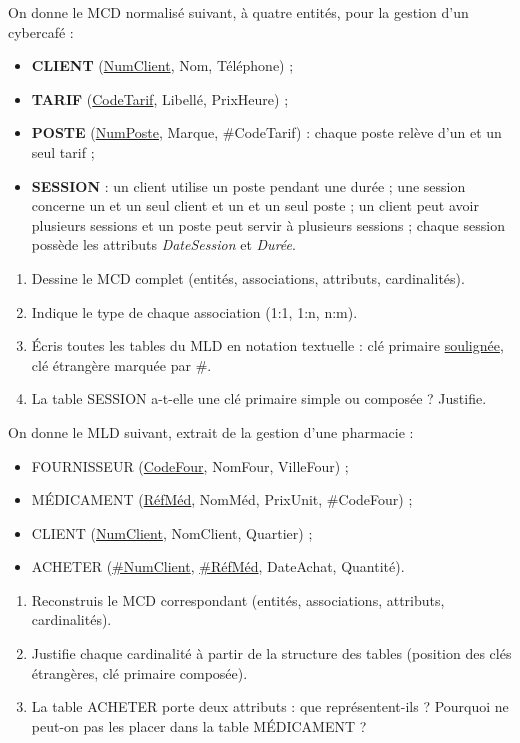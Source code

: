 \documentclass[11pt]{article}
\begin{document}
\begin{exercice}
On donne le MCD normalisé suivant, à quatre entités, pour la gestion d'un cybercafé :

\begin{itemize}
  \item \textbf{CLIENT} (\underline{NumClient}, Nom, Téléphone) ;
  \item \textbf{TARIF} (\underline{CodeTarif}, Libellé, PrixHeure) ;
  \item \textbf{POSTE} (\underline{NumPoste}, Marque, \#CodeTarif) : chaque poste relève d'un et un seul tarif ;
  \item \textbf{SESSION} : un client utilise un poste pendant une durée ; une session concerne un et un seul client et un et un seul poste ; un client peut avoir plusieurs sessions et un poste peut servir à plusieurs sessions ; chaque session possède les attributs \emph{DateSession} et \emph{Durée}.
\end{itemize}

\begin{enumerate}
  \item Dessine le MCD complet (entités, associations, attributs, cardinalités).
  \item Indique le type de chaque association (1:1, 1:n, n:m).
  \item Écris toutes les tables du MLD en notation textuelle : clé primaire \underline{soulignée}, clé étrangère marquée par \#.
  \item La table SESSION a-t-elle une clé primaire simple ou composée ? Justifie.
\end{enumerate}
\end{exercice}

\begin{exercice}
On donne le MLD suivant, extrait de la gestion d'une pharmacie :

\begin{itemize}
  \item FOURNISSEUR (\underline{CodeFour}, NomFour, VilleFour) ;
  \item MÉDICAMENT (\underline{RéfMéd}, NomMéd, PrixUnit, \#CodeFour) ;
  \item CLIENT (\underline{NumClient}, NomClient, Quartier) ;
  \item ACHETER (\underline{\#NumClient}, \underline{\#RéfMéd}, DateAchat, Quantité).
\end{itemize}

\begin{enumerate}
  \item Reconstruis le MCD correspondant (entités, associations, attributs, cardinalités).
  \item Justifie chaque cardinalité à partir de la structure des tables (position des clés étrangères, clé primaire composée).
  \item La table ACHETER porte deux attributs : que représentent-ils ? Pourquoi ne peut-on pas les placer dans la table MÉDICAMENT ?
\end{enumerate}
\end{exercice}
\end{document}
